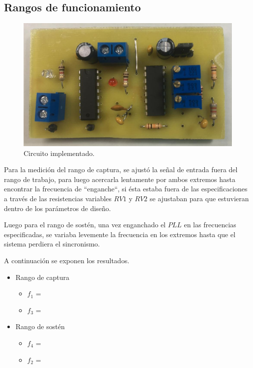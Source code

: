 \documentclass[twocolumn]{article}
\begin{document}
\subsection{Rangos de funcionamiento}
\begin{figure}[H]
  \centering    
  \includegraphics[width=\columnwidth]{imagenes/fig6.jpg}
	\caption{Circuito implementado.}\label{fig:fig6}
\end{figure}

Para la medición del rango de captura, se ajustó la señal de entrada fuera del rango de trabajo, para luego acercarla lentamente por ambos extremos hasta encontrar la frecuencia de ``enganche``, si ésta estaba fuera de las especificaciones a través de las resistencias variables $RV1$ y $RV2$ se ajustaban para que estuvieran dentro de los parámetros de diseño.

Luego para el rango de sostén, una vez enganchado el $PLL$ en las frecuencias especificadas, se variaba levemente la frecuencia en los extremos hasta que el sistema perdiera el sincronismo.

A continuación se exponen los resultados.
\begin{itemize}
	\item Rango de captura
		\begin{itemize}
			\item $f_1$ = 
			\item $f_3$ = 
		\end{itemize}
	\item Rango de sostén
		\begin{itemize}
		  \item $f_4$ = 
		  \item $f_2$ =
		\end{itemize}
\end{itemize}
\end{document}
